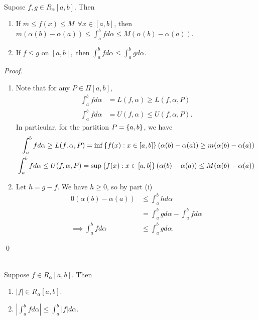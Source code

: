 \begin{theorem} \leavevmode \\
    \label{Thm6.12}
    Supose $f,g \in R_\alpha[a,b].$ Then
    \begin{enumerate}
        \item If $m \leq f(x) \leq M ~~\forall x \in [a,b]$, then $m(\alpha(b) - \alpha(a)) \leq \int_a^bfd \alpha \leq M(\alpha(b) - \alpha(a)).$
        \item If $f \leq g$ on $[a,b],$ then $\int_a^bfd \alpha \leq \int_a^b g d\alpha.$
    \end{enumerate}
\end{theorem}

\begin{proof}
    \begin{enumerate}
        \item Note that for any $P\in \Pi[a,b],$
        \begin{align*}
            \int_a^b fd\alpha &= L(f, \alpha) \geq L(f, \alpha, P) \\
            \int_a^b fd\alpha &= U(f, \alpha) \leq U(f, \alpha, P).
        \end{align*}
        In particular, for the partition $P = \left\{a,b\right\}$, we have
        \begin{align*}
            \int_a^b fd\alpha \geq L(f, \alpha, P) = \inf \left\{f(x) : x \in [a,b]\right\} (\alpha(b) - \alpha(a)) \geq m(\alpha(b) - \alpha(a)) \\
            \int_a^b fd\alpha \leq U(f, \alpha, P) = \sup \left\{f(x) : x \in [a,b]\right\} (\alpha(b) - \alpha(a)) \leq M(\alpha(b) - \alpha(a))
        \end{align*}
        
        \item Let $h = g - f$. We have $h \geq 0$, so by part (i) 
        \begin{align*}
            0(\alpha(b) - \alpha(a)) &\leq \int_a^b h d\alpha \\
            & = \int_a^bgd \alpha - \int_a^b f d\alpha \\
            \implies \int_a^bfd \alpha & \leq \int_a^b gd \alpha.
        \end{align*}
    \end{enumerate}
    \qed
\end{proof}

\begin{theorem} \leavevmode \\
    \label{Thm6.13}
    Suppose $f \in R_\alpha[a,b]$. Then
    \begin{enumerate}
        \item $|f| \in R_\alpha[a,b]$.
        \item $|\int_a^b fd\alpha| \leq \int_a^b |f| d\alpha$.
    \end{enumerate}
\end{theorem}

